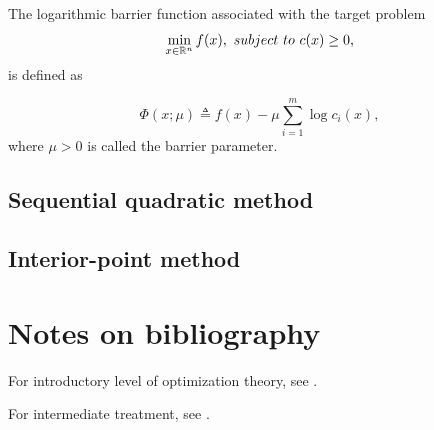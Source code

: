\begin{refsection}
\begin{definition}
The logarithmic barrier function associated with the target problem 
$$\min_{x\in\mathbb{R}^n} f(x), ~subject~to~c(x) \geq 0,$$
is defined as

	$$\Phi(x;\mu) \triangleq f(x) - \mu\sum_{i=1}^m \log c_i(x), $$
where $\mu > 0$ is called the barrier parameter.
\end{definition}


\subsection{Sequential quadratic method}



\subsection{Interior-point method}


\section{Notes on bibliography}
For introductory level of optimization theory, see \cite{sundaram1996first}.

For intermediate treatment, see \cite{Robinson2015nonlinear2}\cite{nocedal2006numerical}.
\printbibliography

\end{refsection}

